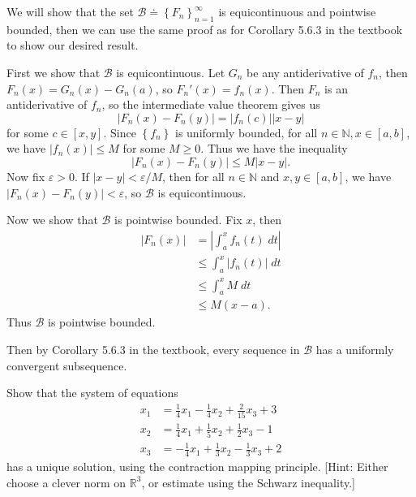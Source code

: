 \documentclass[10pt]{amsart}
\newenvironment{exercise}[1]{%
        \vspace{10mm}
        \renewcommand\themanualtheoreminner{#1}%
  \manualtheoreminner
}\hrulefill{\endmanualtheoreminner}
\begin{document}
We will show that the set $\mathcal{B} \doteq \left\{ F_n \right\}_{n=1}^\infty$ is equicontinuous and pointwise bounded, then we can use the same proof as for Corollary 5.6.3 in the textbook to show our desired result.

First we show that $\mathcal{B}$ is equicontinuous. Let $G_n$ be any antiderivative of $f_n$, then $F_n(x) = G_n(x) - G_n(a)$, so $F_n'(x) = f_n(x)$. Then $F_n$ is an antiderivative of $f_n$, so the intermediate value theorem gives us
\[
	|F_n(x) - F_n(y)| = |f_n(c)| |x-y|
\] for some $c \in [x,y]$. Since $\left\{ f_n \right\}$ is uniformly bounded, for all $ n \in \mathbb{N}, x \in [a,b]$, we have $|f_n(x)| \leq M$ for some $M \geq 0$. Thus we have the inequality
\[
	|F_n(x) - F_n(y)| \leq M |x-y|.
\] 
Now fix $\varepsilon>0$. If $|x-y| < \varepsilon/M$, then for all $n \in \mathbb{N}$ and $x,y \in [a,b]$, we have $|F_n(x) - F_n(y)| < \varepsilon$, so $\mathcal{B}$ is equicontinuous.

Now we show that $\mathcal{B}$ is pointwise bounded. Fix $x$, then
\begin{align*}
	|F_n(x)| &= \left| \int_{a}^{x} f_n(t) \;dt \right| \\
		 &\leq \int_{a}^{x} \left| f_n(t) \right| \;dt \\
		 &\leq \int_{a}^{x} M \;dt \\
		 &\leq M (x-a).
\end{align*}
Thus $\mathcal{B}$ is pointwise bounded.

Then by Corollary 5.6.3 in the textbook, every sequence in $\mathcal{B}$ has a uniformly convergent subsequence.

\begin{exercise}{Page 282, Ex. 4}
	Show that the system of equations
	\begin{align*}
		x_1 &= \frac{1}{4} x_1 - \frac{1}{4} x_2+\frac{2}{15} x_3 + 3 \\
		x_2 &= \frac{1}{4} x_1+\frac{1}{5} x_2+\frac{1}{2} x_3-1 \\
		x_3&= -\frac{1}{4} x_1+\frac{1}{3} x_2-\frac{1}{3} x_3+2
	\end{align*}
	has a unique solution, using the contraction mapping principle. [Hint: Either choose a clever norm on $\mathbb{R}^3$, or estimate using the Schwarz inequality.]
\end{exercise}
\end{document}
